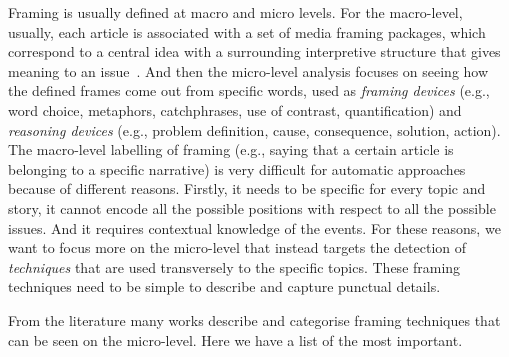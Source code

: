 Framing is usually defined at macro and micro levels.
For the macro-level, usually, each article is associated with a set of media framing packages, which correspond to a central idea with a surrounding interpretive structure that gives meaning to an issue~\cite{gamson1989media}.
And then the micro-level analysis focuses on seeing how the defined frames come out from specific words, used as \textit{framing devices} (e.g., word choice, metaphors, catchphrases, use of contrast, quantification) and \textit{reasoning devices} (e.g., problem definition, cause, consequence, solution, action).
The macro-level labelling of framing (e.g., saying that a certain article is belonging to a specific narrative) is very difficult for automatic approaches because of different reasons. Firstly, it needs to be specific for every topic and story, it cannot encode all the possible positions with respect to all the possible issues. And it requires contextual knowledge of the events.
For these reasons, we want to focus more on the micro-level that instead targets the detection of \emph{techniques} that are used transversely to the specific topics. These framing techniques need to be simple to describe and capture punctual details.

From the literature many works describe and categorise framing techniques that can be seen on the micro-level. Here we have a list of the most important.

